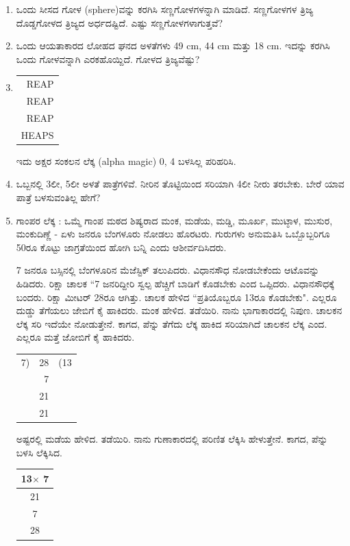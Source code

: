 \begin{enumerate}
\item ಒಂದು ಸೀಸದ ಗೋಳ (sphere)ವನ್ನು ಕರಗಿಸಿ ಸಣ್ಣಗೋಳಗಳನ್ನಾಗಿ ಮಾಡಿದೆ. ಸಣ್ಣಗೋಳಗಳ ತ್ರಿಜ್ಯ ದೊಡ್ಡಗೋಳದ ತ್ರಿಜ್ಯದ ಅರ್ಧದಷ್ಟಿದೆ. ಎಷ್ಟು ಸಣ್ಣಗೋಳಗಳಾಗುತ್ತವೆ? 

\item ಒಂದು ಆಯತಾಕಾರದ ಲೋಹದ ಘನದ ಅಳತೆಗಳು 49 cm, 44 cm ಮತ್ತು 18 cm. ಇದನ್ನು ಕರಗಿಸಿ ಒಂದು ಗೋಳವನ್ನಾಗಿ ಎರಕಹೊಯ್ದಿದೆ. ಗೋಳದ ತ್ರಿಜ್ಯವೆಷ್ಟು? 

\item 
\begin{tabular}[t]{r}
REAP\\
REAP\\
REAP\\
\hline
HEAPS
\end{tabular}

ಇದು ಅಕ್ಷರ ಸಂಕಲನ ಲೆಕ್ಕ (alpha magic) 0, 4 ಬಳಸಿಲ್ಲ ಪರಿಹರಿಸಿ. 

\item ಒಬ್ಬನಲ್ಲಿ 3ಲೀ, 5ಲೀ ಅಳತೆ ಪಾತ್ರೆಗಳಿವೆ. ನೀರಿನ ತೊಟ್ಟಿಯಿಂದ ಸರಿಯಾಗಿ 4ಲೀ ನೀರು ತರಬೇಕು. ಬೇರೆ ಯಾವ ಪಾತ್ರೆ ಬಳಸುವಂತಿಲ್ಲ ಹೇಗೆ?  

\item ಗಾಂಪರ ಲೆಕ್ಕ : ಒಮ್ಮೆ ಗಾಂಪ ಮಠದ ಶಿಷ್ಯರಾದ ಮಂಕ, ಮಡೆಯ, ಮಡ್ಡಿ, ಮೂರ್ಖ, ಮುಟ್ಠಾಳ, ಮುಸುರ, ಮಂಕುದಿಣ್ಣೆ  - ಏಳು ಜನರೂ ಬೆಂಗಳೂರು ನೋಡಲು ಹೊರಟರು. ಗುರುಗಳು ಅನುಮತಿಸಿ ಒಬ್ಬೊಬ್ಬರಿಗೂ 50ರೂ ಕೊಟ್ಟು ಜಾಗ್ರತೆಯಿಂದ ಹೋಗಿ ಬನ್ನಿ ಎಂದು ಆಶೀರ್ವದಿಸಿದರು. 

\vskip 0.2cm

7 ಜನರೂ ಬಸ್ಸಿನಲ್ಲಿ ಬೆಂಗಳೂರಿನ ಮೆಜೆಸ್ಟಿಕ್ ತಲುಪಿದರು. ವಿಧಾನಸೌಧ ನೋಡಬೇಕೆಂದು ಆಟೊವನ್ನು ಹಿಡಿದರು. ರಿಕ್ಷಾ ಚಾಲಕ ``7 ಜನರಿದ್ದೀರಿ ಸ್ವಲ್ಪ ಹೆಚ್ಚಿಗೆ ಬಾಡಿಗೆ ಕೊಡಬೇಕು ಎಂದ ಒಪ್ಪಿದರು. ವಿಧಾನಸೌಧಕ್ಕೆ ಬಂದರು. ರಿಕ್ಷಾ ಮೀಟರ್ 28ರೂ ಆಗಿತ್ತು. ಚಾಲಕ ಹೇಳಿದ ``ಪ್ರತಿಯೊಬ್ಬರೂ 13ರೂ ಕೊಡಬೇಕು". ಎಲ್ಲರೂ ದುಡ್ಡು ತೆಗೆಯಲು ಜೇಬಿಗೆ ಕೈ ಹಾಕಿದರು. ಮಂಕ ಹೇಳಿದ. ತಡೆಯಿರಿ. ನಾನು ಭಾಗಾಕಾರದಲ್ಲಿ ನಿಪುಣ. ಚಾಲಕನ ಲೆಕ್ಕ ಸರಿ ಇದೆಯೇ ನೋಡುತ್ತೇನೆ. ಕಾಗದ, ಪೆನ್ನು ತೆಗೆದು ಲೆಕ್ಕ ಹಾಕಿದ ಸರಿಯಾಗಿದೆ ಚಾಲಕನ ಲೆಕ್ಕ ಎಂದ. ಎಲ್ಲರೂ ಮತ್ತೆ ಜೋಬಿಗೆ  ಕೈ ಹಾಕಿದರು. 

\begin{tabular}[t]{l@{\;}r@{\;}l}
7)& 28& (13\\
& 7 & \\
\hline
& 21& \\
& 21 &\\
\hline
\end{tabular}

ಅಷ್ಟರಲ್ಲಿ ಮಡೆಯ ಹೇಳಿದ. ತಡೆಯಿರಿ. ನಾನು ಗುಣಾಕಾರದಲ್ಲಿ ಪರಿಣಿತ ಲೆಕ್ಕಿಸಿ ಹೇಳುತ್ತೇನೆ. ಕಾಗದ, ಪೆನ್ನು ಬಳಸಿ ಲೆಕ್ಕಿಸಿದ. 

\begin{tabular}[t]{c}
13$\times$ 7\\
\hline
21\\
7\\
\hline
28\\
\hline
\end{tabular}


\end{enumerate}
